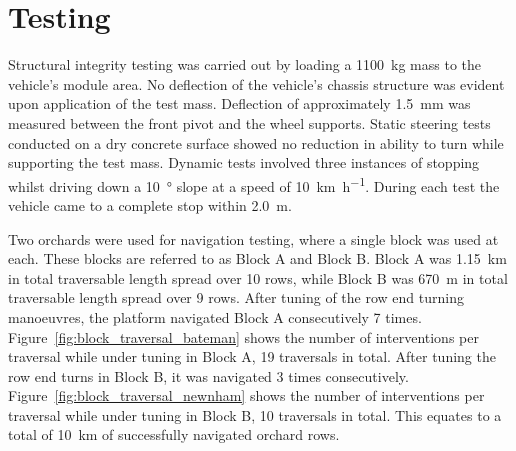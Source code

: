 \documentclass[preprint,authoryear,12pt]{elsarticle}
\begin{document}
\section{Testing}
\label{sub:testing}

    Structural integrity testing was carried out by loading a \SI{1100}{\kilo\gram} mass to the vehicle's module area.
    No deflection of the vehicle's chassis structure was evident upon application of the test mass.
    Deflection of approximately \SI{1.5}{\milli\meter} was measured between the front pivot and the wheel supports.
    Static steering tests conducted on a dry concrete surface showed no reduction in ability to turn while supporting the test mass.
    Dynamic tests involved three instances of stopping whilst driving down a \SI{10}{\degree} slope at a speed of \SI{10}{\kilo\meter\per\hour}.
    During each test the vehicle came to a complete stop within \SI{2.0}{\meter}.

    Two orchards were used for navigation testing, where a single block was used at each.
    These blocks are referred to as Block A and Block B.
    Block A was \SI{1.15}{\kilo\meter} in total traversable length spread over 10 rows, while Block B was \SI{670}{\meter} in total traversable length spread over 9 rows.
    After tuning of the row end turning manoeuvres, the platform navigated Block A consecutively 7 times.
    Figure~\ref{fig:block_traversal_bateman} shows the number of interventions per traversal while under tuning in Block A, 19 traversals in total.
    After tuning the row end turns in Block B, it was navigated 3 times consecutively.
    Figure~\ref{fig:block_traversal_newnham} shows the number of interventions per traversal while under tuning in Block B, 10 traversals in total.
    This equates to a total of \SI{10}{\kilo\meter} of successfully navigated orchard rows.
\end{document}

